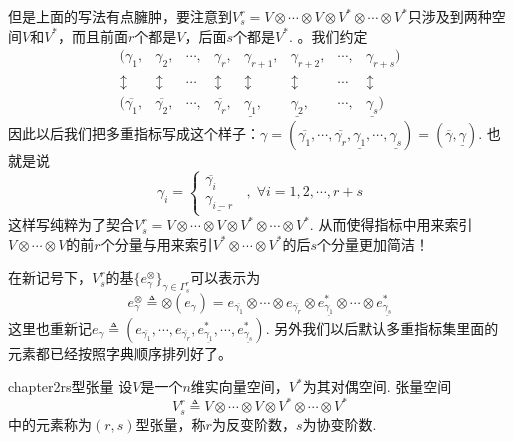 但是上面的写法有点臃肿，要注意到$V^{r}_{s}=V\otimes \cdots\otimes V\otimes V^{\ast}\otimes \cdots\otimes V^{\ast}$只涉及到两种空间$V$和$V^{\ast}$，而且前面$r$个都是$V$，后面$s$个都是$V^{\ast}$. {}。我们约定
\[
\begin{array}{cccccccc}({\gamma_{1},} & {\gamma_{2}}, & {\cdots}, & {\gamma_{r}},& {\gamma_{r+1}},& {\gamma_{r+2}},& {\cdots},& {\gamma_{r+s}}) \\{\updownarrow} & {\updownarrow} & { \cdots} & {\updownarrow}& {\updownarrow}& {\updownarrow}& {\cdots }& {\updownarrow} \\ ({\overline{\gamma_{1}}}, & {\overline{\gamma_{2}}}, & {\cdots}, & {\overline{\gamma_{r}}},& {\underline{\gamma_{1}}},& {\underline{\gamma_{2}}},& {\cdots},& {\underline{\gamma_{s}}})\end{array}
\]
因此以后我们把多重指标写成这个样子：$\gamma=\left(\boxed{\overline{\gamma_{1}},\cdots,\overline{\gamma_{r}}},\boxed{\underline{\gamma_{1}},\cdots,\underline{\gamma_{s}}} \right)=\left(\overline{\gamma},\underline{\gamma} \right)$. 也就是说
\[
\gamma_{ i }= \left\{\begin{array}{l}\overline{\gamma_{i}} \\ \underline{\gamma_{i-r}}\end{array}\right.\;\;,\;\forall i=1,2,\cdots,r+s
\]
这样写纯粹为了契合$V^{r}_{s}=V\otimes \cdots\otimes V\otimes V^{\ast}\otimes \cdots\otimes V^{\ast}$. 从而使得指标中用来索引$V\otimes\cdots\otimes V$的前$r$个分量与用来索引$V^{\ast}\otimes\cdots\otimes V^{\ast}$的后$s$个分量更加简洁！

在新记号下，$V^{r}_{s}$的基$\{e^{\otimes}_{\gamma} \}_{\gamma\in \Gamma^{r}_{s}}$可以表示为
\[
e^{\otimes}_{\gamma}\triangleq\otimes(e_{\gamma})= e_{\overline{\gamma_{1}}}\otimes\cdots\otimes e_{\overline{\gamma_{r}}}\otimes e^{\ast}_{\underline{\gamma_{1}}} \otimes\cdots\otimes e^{\ast}_{\underline{\gamma_{s}}} 
\]
这里也重新记$e_{\gamma}\triangleq (e_{\overline{\gamma_{1}}},\cdots, e_{\overline{\gamma_{r}}}, e^{\ast}_{\underline{\gamma_{1}}} ,\cdots,e^{\ast}_{\underline{\gamma_{s}}} )$. 另外我们以后默认多重指标集里面的元素都已经按照字典顺序排列好了。

\begin{mydef}{}{chapter2rs型张量}
	设$V$是一个$n$维实向量空间，$V^{\ast}$为其对偶空间. 张量空间
	\[
	V^{r}_{s}\triangleq V\otimes \cdots\otimes V\otimes V^{\ast}\otimes \cdots\otimes V^{\ast}
	\]
	中的元素称为$(r,s)$型张量，称$r$为反变阶数，$s$为协变阶数.
\end{mydef}

